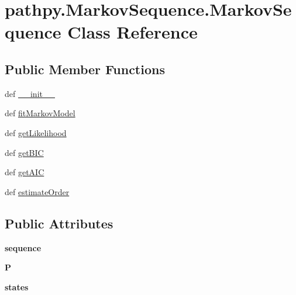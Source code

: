 \hypertarget{classpathpy_1_1MarkovSequence_1_1MarkovSequence}{\section{pathpy.\-Markov\-Sequence.\-Markov\-Sequence Class Reference}
\label{classpathpy_1_1MarkovSequence_1_1MarkovSequence}
}
\subsection*{Public Member Functions}
\begin{DoxyCompactItemize}
\item 
def \hyperlink{classpathpy_1_1MarkovSequence_1_1MarkovSequence_a670778608688e4926328cf2d851b7d6d}{\-\_\-\-\_\-init\-\_\-\-\_\-}
\item 
def \hyperlink{classpathpy_1_1MarkovSequence_1_1MarkovSequence_a422f6b70f888eaab6a6f942158355072}{fit\-Markov\-Model}
\item 
def \hyperlink{classpathpy_1_1MarkovSequence_1_1MarkovSequence_ab820bbcfb5569ef05e361aa478c521f6}{get\-Likelihood}
\item 
def \hyperlink{classpathpy_1_1MarkovSequence_1_1MarkovSequence_a975922931ec471f436c4d340830a7ca3}{get\-B\-I\-C}
\item 
def \hyperlink{classpathpy_1_1MarkovSequence_1_1MarkovSequence_aba5377e966e3bfb9c4c736e782863484}{get\-A\-I\-C}
\item 
def \hyperlink{classpathpy_1_1MarkovSequence_1_1MarkovSequence_a0e794225267c8195f091f5ed452d34e6}{estimate\-Order}
\end{DoxyCompactItemize}
\subsection*{Public Attributes}
\begin{DoxyCompactItemize}
\item 
\hypertarget{classpathpy_1_1MarkovSequence_1_1MarkovSequence_ac0cbbe436a3938f2ff94d313c72c4e67}{{\bfseries sequence}}\label{classpathpy_1_1MarkovSequence_1_1MarkovSequence_ac0cbbe436a3938f2ff94d313c72c4e67}

\item 
\hypertarget{classpathpy_1_1MarkovSequence_1_1MarkovSequence_ac0d2ff028f2c2c88349555527e44a898}{{\bfseries P}}\label{classpathpy_1_1MarkovSequence_1_1MarkovSequence_ac0d2ff028f2c2c88349555527e44a898}

\item 
\hypertarget{classpathpy_1_1MarkovSequence_1_1MarkovSequence_a77ca53bfcfb5458a8834b8b6392422ce}{{\bfseries states}}\label{classpathpy_1_1MarkovSequence_1_1MarkovSequence_a77ca53bfcfb5458a8834b8b6392422ce}

\end{DoxyCompactItemize}


